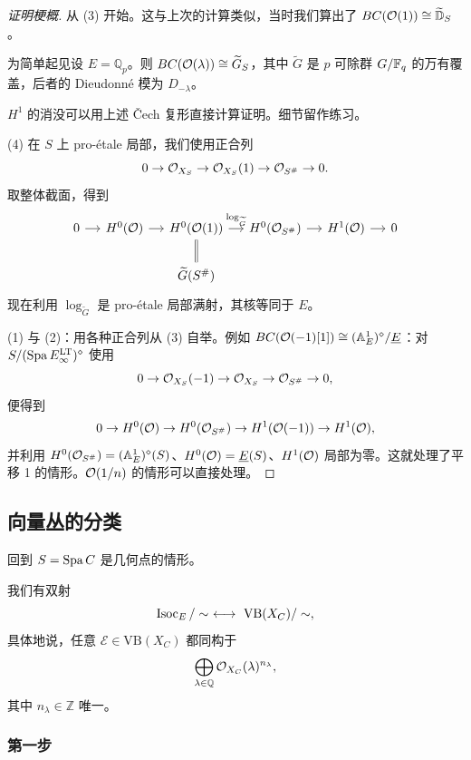 \begin{proof}[证明梗概]
从 (3) 开始。这与上次的计算类似，当时我们算出了 $BC(\mathcal{O}(1))\cong\widetilde{\mathbb{D}}_S$。

为简单起见设 $E=\mathbb{Q}_p$。则 $BC(\mathcal{O}(\lambda))\cong\widetilde{G}_S$，其中 $\widetilde{G}$ 是 $p$ 可除群 $G/\mathbb{F}_q$ 的万有覆盖，后者的 Dieudonné 模为 $D_{-\lambda}$。

$H^1$ 的消没可以用上述 \v{C}ech 复形直接计算证明。细节留作练习。

(4) 在 $S$ 上 pro-étale 局部，我们使用正合列
\[
0\to\mathcal{O}_{X_S}\to\mathcal{O}_{X_S}(1)\to\mathcal{O}_{S^\#}\to0.
\]
取整体截面，得到
\[
\begin{tikzcd}[column sep=small]
0 \arrow[r] & H^0(\cO) \arrow[r] & H^0(\cO(1)) \arrow[r,"\log_{\widetilde G}"] \arrow[d,equal] & H^0(\cO_{S^\#}) \arrow[r] & H^1(\cO) \arrow[r] & 0\\
& & \widetilde{G}(S^\#) & & &
\end{tikzcd}
\]
现在利用 $\log_{\widetilde G}$ 是 pro-étale 局部满射，其核等同于 $E$。

(1) 与 (2)：用各种正合列从 (3) 自举。例如 $BC(\mathcal{O}(-1)[1])\cong(\mathbb{A}^1_E)^\diamond/\underline{E}$：对 $S/(\operatorname{Spa} E^{\mathrm{LT}}_\infty)^\diamond$ 使用
\[
0\to\mathcal{O}_{X_S}(-1)\to\mathcal{O}_{X_S}\to\mathcal{O}_{S^\#}\to0,
\]
便得到
\[
0\to H^0(\mathcal{O})\to H^0(\mathcal{O}_{S^\#})\to H^1(\mathcal{O}(-1))\to H^1(\mathcal{O}),
\]
并利用 $H^0(\mathcal{O}_{S^\#})=(\mathbb{A}^1_E)^\diamond(S)$、$H^0(\mathcal{O})=\underline{E}(S)$、$H^1(\mathcal{O})$ 局部为零。这就处理了平移 1 的情形。$\mathcal{O}(1/n)$ 的情形可以直接处理。
\end{proof}


\subsection{向量丛的分类}

回到 $S=\operatorname{Spa} C$ 是几何点的情形。

\begin{theorem}
我们有双射
\[
\Isoc_E/\sim\ \longleftrightarrow\ \mathrm{VB}(X_C)/\sim,
\]
具体地说，任意 $\mathcal{E}\in\mathrm{VB}(X_C)$ 都同构于
\[
\bigoplus_{\lambda\in\mathbb{Q}}\mathcal{O}_{X_C}(\lambda)^{n_\lambda},
\]
其中 $n_\lambda\in\mathbb{Z}$ 唯一。
\end{theorem}

\subsubsection{第一步}

